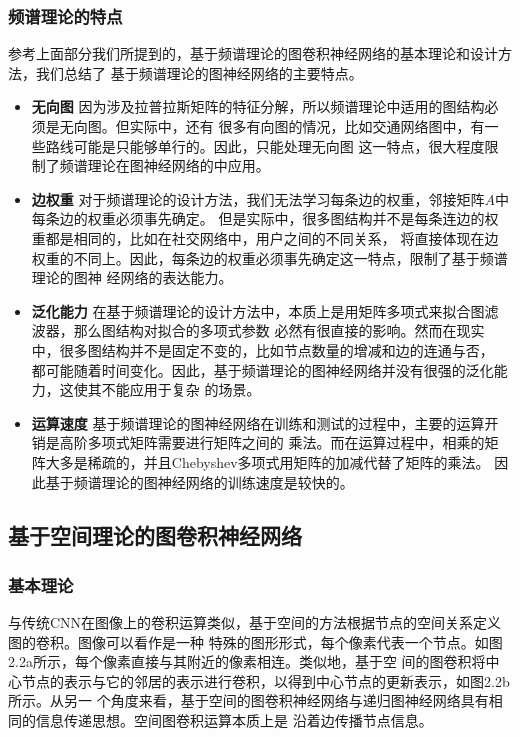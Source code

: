 \subsubsection{频谱理论的特点}
参考上面部分我们所提到的，基于频谱理论的图卷积神经网络的基本理论和设计方法，我们总结了
基于频谱理论的图神经网络的主要特点。
\begin{itemize}
    \item \textbf{无向图} \quad
    因为涉及拉普拉斯矩阵的特征分解，所以频谱理论中适用的图结构必须是无向图。但实际中，还有
    很多有向图的情况，比如交通网络图中，有一些路线可能是只能够单行的。因此，只能处理无向图
    这一特点，很大程度限制了频谱理论在图神经网络的中应用。
    
    \item \textbf{边权重} \quad
    对于频谱理论的设计方法，我们无法学习每条边的权重，邻接矩阵$A$中每条边的权重必须事先确定。
    但是实际中，很多图结构并不是每条连边的权重都是相同的，比如在社交网络中，用户之间的不同关系，
    将直接体现在边权重的不同上。因此，每条边的权重必须事先确定这一特点，限制了基于频谱理论的图神
    经网络的表达能力。

    \item \textbf{泛化能力} \quad
    在基于频谱理论的设计方法中，本质上是用矩阵多项式来拟合图滤波器，那么图结构对拟合的多项式参数
    必然有很直接的影响。然而在现实中，很多图结构并不是固定不变的，比如节点数量的增减和边的连通与否，
    都可能随着时间变化。因此，基于频谱理论的图神经网络并没有很强的泛化能力，这使其不能应用于复杂
    的场景。

    \item \textbf{运算速度} \quad
    基于频谱理论的图神经网络在训练和测试的过程中，主要的运算开销是高阶多项式矩阵需要进行矩阵之间的
    乘法。而在运算过程中，相乘的矩阵大多是稀疏的，并且Chebyshev多项式用矩阵的加减代替了矩阵的乘法。
    因此基于频谱理论的图神经网络的训练速度是较快的。
\end{itemize}

\subsection{基于空间理论的图卷积神经网络}
\subsubsection{基本理论}
与传统CNN在图像上的卷积运算类似，基于空间的方法根据节点的空间关系定义图的卷积。图像可以看作是一种
特殊的图形形式，每个像素代表一个节点。如图2.2a所示，每个像素直接与其附近的像素相连。类似地，基于空
间的图卷积将中心节点的表示与它的邻居的表示进行卷积，以得到中心节点的更新表示，如图2.2b所示。从另一
个角度来看，基于空间的图卷积神经网络与递归图神经网络具有相同的信息传递思想。空间图卷积运算本质上是
沿着边传播节点信息。

